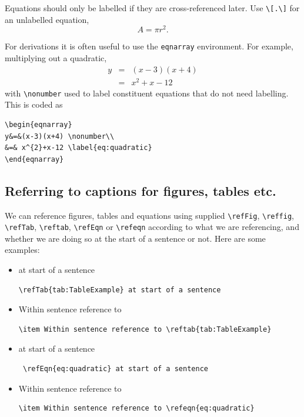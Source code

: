 \documentclass[12pt,oneside]{book} %
\begin{document}
Equations should only be labelled if they are cross-referenced later. Use \verb#\[.\]# for an unlabelled equation,
\[
A=\pi r^2.
\]

For derivations it is often useful to use the \verb#eqnarray# environment. For example, multiplying out a quadratic,
\begin{eqnarray}
y&=&(x-3)(x+4) \nonumber\\
&=& x^{2}+x-12 \label{eq:quadratic}
\end{eqnarray}
with \verb#\nonumber# used to label constituent equations that do not need labelling. This is coded as 
\begin{verbatim}
\begin{eqnarray}
y&=&(x-3)(x+4) \nonumber\\
&=& x^{2}+x-12 \label{eq:quadratic}
\end{eqnarray}
\end{verbatim}

\subsection{Referring to captions for figures, tables etc.}
We can reference figures, tables and equations using supplied \verb#\refFig#, \verb#\reffig#, \linebreak\verb#\refTab#, \verb#\reftab#, \verb#\refEqn# or \verb#\refeqn# according to what we are referencing, and whether we are doing so at the start of a sentence or not. Here are some examples:
\begin{itemize}
\item {} at start of a sentence
\begin{verbatim}
\refTab{tab:TableExample} at start of a sentence 
\end{verbatim}
\item Within sentence reference to  
\begin{verbatim}
\item Within sentence reference to \reftab{tab:TableExample} 
\end{verbatim}
\item {} at start of a sentence
\begin{verbatim}
 \refEqn{eq:quadratic} at start of a sentence
\end{verbatim}
\item Within sentence reference to  
\begin{verbatim}
\item Within sentence reference to \refeqn{eq:quadratic} 
\end{verbatim}
\end{itemize}
\end{document}
